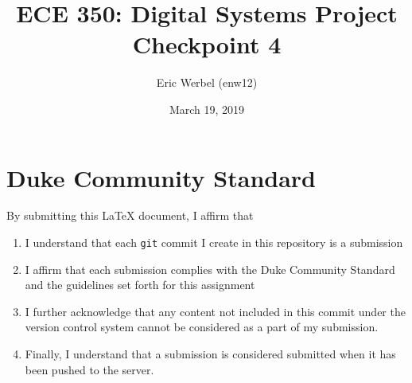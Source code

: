 \documentclass[letterpaper]{article} %
\begin{document}
\title{ECE 350: Digital Systems Project Checkpoint 4}
\author{Eric Werbel (enw12)}
\date{March 19, 2019}
\maketitle

\section*{Duke Community Standard}

By submitting this \LaTeX{} document, I affirm that
\begin{enumerate}
    \item I understand that each \texttt{git} commit I create in this repository is a submission
    \item I affirm that each submission complies with the Duke Community Standard and the guidelines set forth for this assignment
    \item I further acknowledge that any content not included in this commit under the version control system cannot be considered as a part of my submission.
    \item Finally, I understand that a submission is considered submitted when it has been pushed to the server.
\end{enumerate}
\end{document}
